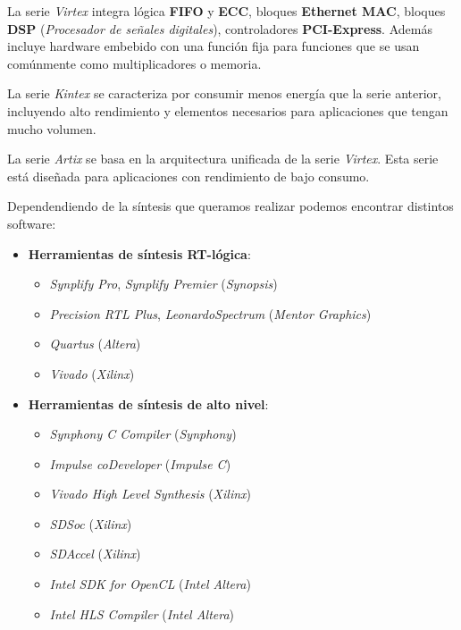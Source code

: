 La serie \textit{Virtex} integra lógica \textbf{FIFO} y \textbf{ECC}, bloques \textbf{Ethernet MAC}, bloques \textbf{DSP} (\textit{Procesador 
de señales digitales}), controladores \textbf{PCI-Express}. Además incluye hardware embebido con una función fija para funciones que se 
usan comúnmente como multiplicadores o memoria. 

La serie \textit{Kintex} se caracteriza por consumir menos energía que la serie anterior, incluyendo alto rendimiento y elementos necesarios 
para aplicaciones que tengan mucho volumen.

La serie \textit{Artix} se basa en la arquitectura unificada de la serie \textit{Virtex}. Esta serie está diseñada para aplicaciones con 
rendimiento de bajo consumo. 

Dependendiendo de la síntesis que queramos realizar podemos encontrar distintos software:

\begin{itemize}
    \item \textbf{Herramientas de síntesis RT-lógica}:
        \begin{itemize}
            \item \textit{Synplify Pro}, \textit{Synplify Premier} (\textit{Synopsis})
            \item \textit{Precision RTL Plus}, \textit{LeonardoSpectrum} (\textit{Mentor Graphics})
            \item \textit{Quartus} (\textit{Altera})
            \item \textit{Vivado} (\textit{Xilinx})
        \end{itemize}
    \item \textbf{Herramientas de síntesis de alto nivel}:
        \begin{itemize}
            \item \textit{Synphony C Compiler} (\textit{Synphony})
            \item \textit{Impulse coDeveloper} (\textit{Impulse C})
            \item \textit{Vivado High Level Synthesis} (\textit{Xilinx})
            \item \textit{SDSoc} (\textit{Xilinx})
            \item \textit{SDAccel} (\textit{Xilinx})
            \item \textit{Intel SDK for OpenCL} (\textit{Intel Altera})
            \item \textit{Intel HLS Compiler} (\textit{Intel Altera})
        \end{itemize}
\end{itemize}

